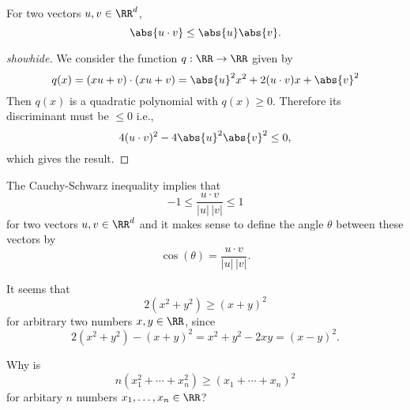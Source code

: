 \documentclass{article}
\begin{document}
\begin{theorem}\label{cs}
  For two vectors $u, v\in \RR^d$,
  $$
  \abs{u\cdot v} \leq \abs{u} \abs{v}.
  $$
\end{theorem}
  \begin{proof}[showhide]
    We consider the function $q:\RR\rightarrow \RR$ given by
    $$
    q(x) = (x u + v)\cdot (x u + v) = \abs{u}^2 x^2 + 2 (u\cdot v) x + \abs{v}^2
    $$
    Then $q(x)$ is a quadratic polynomial with $q(x)\geq 0$. Therefore
    its discriminant must be $\leq 0$ i.e.,
    $$
    4 (u\cdot v)^2 - 4 \abs{u}^2 \abs{v}^2 \leq 0,
    $$  
    which gives the result.
  \end{proof}


The Cauchy-Schwarz inequality
implies that 
$$
-1 \leq \frac{u\cdot v}{|u|\, |v|} \leq 1
$$
for two vectors $u, v\in \RR^d$ and it makes sense to define the angle
$\theta$ between these vectors by
\begin{equation}\label{cossim}
\cos(\theta) = 
\frac{u \cdot v}{|u|\, |v|}.
\end{equation}

\beginshex
It seems that
$$
2 (x^2 + y^2) \geq (x + y)^2
$$
for arbitrary two numbers $x, y\in \RR$, since
$$
2(x^2 + y^2) - (x + y)^2 = x^2 + y^2 - 2 x y = (x - y)^2.
$$

Why is
$$
n (x_1^2 + \cdots + x_n^2) \geq (x_1 + \cdots + x_n)^2
$$
for arbitary $n$ numbers $x_1, \dots, x_n\in \RR$?
\endshex
\end{document}
